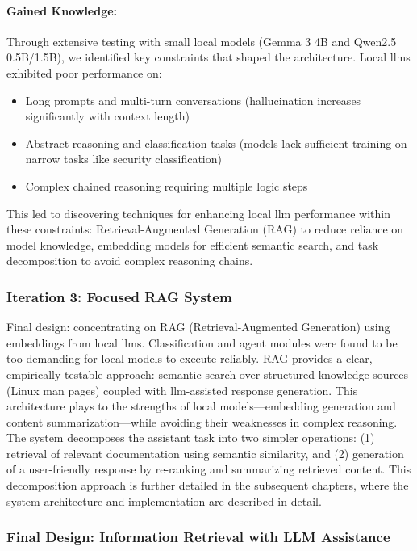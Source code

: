 \paragraph{Gained Knowledge:} Through extensive testing with small local models
(Gemma 3 4B and Qwen2.5 0.5B/1.5B), we identified key constraints that shaped
the architecture. Local \glspl{llm} exhibited poor performance on:
\begin{itemize}
  \item Long prompts and multi-turn conversations (hallucination increases
      significantly with context length)
  \item Abstract reasoning and classification tasks (models lack sufficient
      training on narrow tasks like security classification)
  \item Complex chained reasoning requiring multiple logic steps
\end{itemize}
This led to discovering techniques for enhancing local \gls{llm} performance
within these constraints: Retrieval-Augmented Generation (RAG) to reduce
reliance on model knowledge, embedding models for efficient semantic search, and
task decomposition to avoid complex reasoning chains.

\subsubsection{Iteration 3: Focused RAG System}

Final design: concentrating on RAG (Retrieval-Augmented Generation) using
embeddings from local \glspl{llm}. Classification and agent modules were found
to be too demanding for local models to execute reliably. RAG provides a clear,
empirically testable approach: semantic search over structured knowledge sources
(Linux man pages) coupled with \gls{llm}-assisted response generation. This
architecture plays to the strengths of local models---embedding generation and
content summarization---while avoiding their weaknesses in complex reasoning.
The system decomposes the assistant task into two simpler operations: (1)
retrieval of relevant documentation using semantic similarity, and (2)
generation of a user-friendly response by re-ranking and summarizing retrieved
content. This decomposition approach is further detailed in the subsequent
chapters, where the system architecture and implementation are described in
detail.

\subsubsection{Final Design: Information Retrieval with LLM Assistance}

